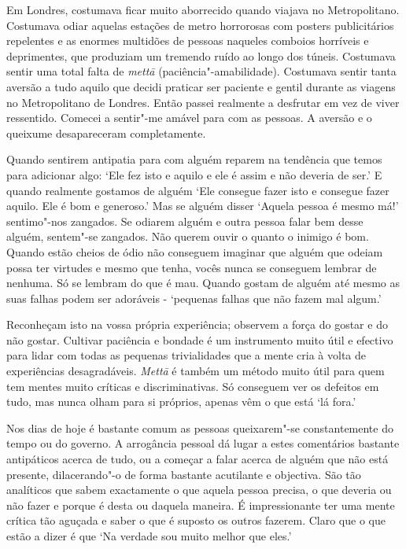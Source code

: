Em Londres, costumava ficar muito aborrecido quando viajava no
Metropolitano. Costumava odiar aquelas estações de metro horrorosas com
posters publicitários repelentes e as enormes multidões de pessoas
naqueles comboios horríveis e deprimentes, que produziam um tremendo
ruído ao longo dos túneis. Costumava sentir uma total falta de
\emph{mettā} (paciência"-amabilidade). Costumava sentir tanta aversão
a tudo aquilo que decidi praticar ser paciente e gentil durante as viagens
no Metropolitano de Londres. Então passei realmente a desfrutar
em vez de viver ressentido. Comecei a sentir"-me amável para com as
pessoas. A aversão e o queixume desapareceram completamente.

Quando sentirem antipatia para com alguém reparem na tendência que temos
para adicionar algo: `Ele fez isto e aquilo e ele é assim e não deveria
de ser.' E quando realmente gostamos de alguém `Ele consegue fazer isto
e consegue fazer aquilo. Ele é bom e generoso.' Mas se alguém disser
`Aquela pessoa é mesmo má!' sentimo"-nos zangados. Se odiarem alguém e
outra pessoa falar bem desse alguém, sentem"-se zangados. Não querem ouvir
o quanto o inimigo é bom. Quando estão cheios de ódio não conseguem
imaginar que alguém que odeiam possa ter virtudes e mesmo que tenha,
vocês nunca se conseguem lembrar de nenhuma. Só se lembram do que é
mau. Quando gostam de alguém até mesmo as suas falhas podem ser
adoráveis - `pequenas falhas que não fazem mal algum.'

Reconheçam isto na vossa própria experiência; observem a força do gostar
e do não gostar. Cultivar paciência e bondade é um instrumento muito
útil e efectivo para lidar com todas as pequenas trivialidades que a
mente cria à volta de experiências
desagradáveis. \emph{Mettā} é também um método muito útil para quem tem
mentes muito críticas e discriminativas. Só conseguem ver os defeitos em
tudo, mas nunca olham para si próprios, apenas vêm o que está `lá fora.'

Nos dias de hoje é bastante comum as pessoas queixarem"-se constantemente
do tempo ou do governo. A arrogância pessoal dá lugar a estes
comentários bastante antipáticos acerca de tudo, ou a começar a falar
acerca de alguém que não está presente, dilacerando"-o de forma bastante
acutilante e objectiva. São tão analíticos que sabem exactamente o que
aquela pessoa precisa, o que deveria ou não fazer e porque é desta ou
daquela maneira. É impressionante ter uma mente crítica tão aguçada e
saber o que é suposto os outros fazerem. Claro que o que estão a dizer é
que `Na verdade sou muito melhor que eles.'

